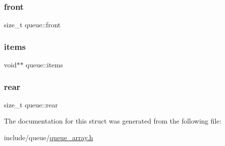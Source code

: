 \subsubsection{\texorpdfstring{front}{front}}
{\footnotesize\ttfamily size\+\_\+t queue\+::front}

\mbox{\label{structqueue_a4c90fc914a6825a61866f13ce4fdb225}} 
\subsubsection{\texorpdfstring{items}{items}}
{\footnotesize\ttfamily void$\ast$$\ast$ queue\+::items}

\mbox{\label{structqueue_a71eff21c56cc3644a766901cd21f773d}} 
\subsubsection{\texorpdfstring{rear}{rear}}
{\footnotesize\ttfamily size\+\_\+t queue\+::rear}



The documentation for this struct was generated from the following file\+:\begin{DoxyCompactItemize}
\item 
include/queue/\mbox{\hyperlink{queue__array_8h}{queue\+\_\+array.\+h}}\end{DoxyCompactItemize}
